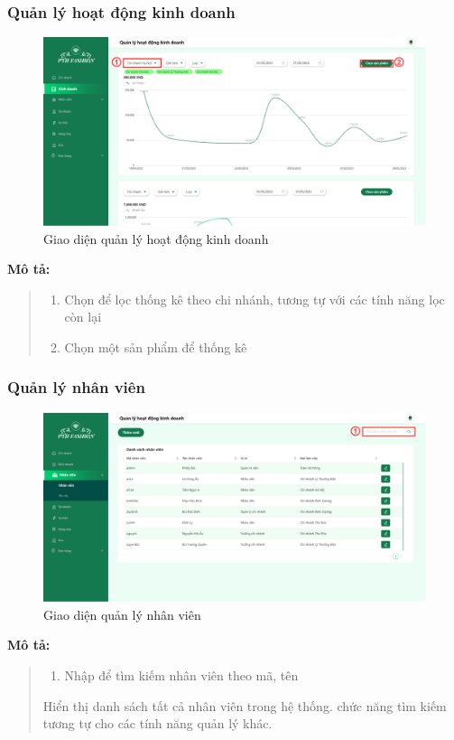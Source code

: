 \newpage

\subsubsection{Quản lý hoạt động kinh doanh}
\begin{figure}[!htp]
    \centering
    \includegraphics[width=12cm]{img/UI/admin_implement/statistic.png}
    \newline
    \caption{Giao diện quản lý hoạt động kinh doanh}
\end{figure}
\textbf{Mô tả:}
\begin{quote}
    \begin{enumerate}
        \item Chọn để lọc thống kê theo chi nhánh, tương tự với các tính năng lọc còn lại
        \item Chọn một sản phẩm để thống kê
    \end{enumerate}
\end{quote}


\subsubsection{Quản lý nhân viên}
\begin{figure}[!htp]
    \centering
    \includegraphics[width=12cm]{img/UI/admin_implement/staff.png}
    \newline
    \caption{Giao diện quản lý nhân viên}
\end{figure}
\textbf{Mô tả:}
\begin{quote}
    \begin{enumerate}
        \item Nhập để tìm kiếm nhân viên theo mã, tên
    \end{enumerate}
    Hiển thị danh sách tất cả nhân viên trong hệ thống. chức năng tìm kiếm tương tự cho các tính năng quản lý khác.
\end{quote}


